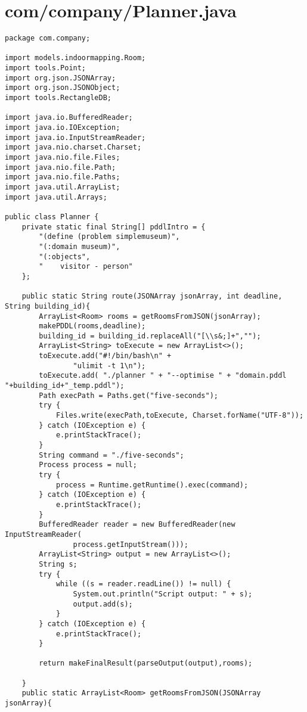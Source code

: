 \documentclass{article}
\begin{document}
\section{com/company/Planner.java}
\begin{lstlisting}package com.company;

import models.indoormapping.Room;
import tools.Point;
import org.json.JSONArray;
import org.json.JSONObject;
import tools.RectangleDB;

import java.io.BufferedReader;
import java.io.IOException;
import java.io.InputStreamReader;
import java.nio.charset.Charset;
import java.nio.file.Files;
import java.nio.file.Path;
import java.nio.file.Paths;
import java.util.ArrayList;
import java.util.Arrays;

public class Planner {
    private static final String[] pddlIntro = {
        "(define (problem simplemuseum)",
        "(:domain museum)",
        "(:objects",
        "    visitor - person"
    };

    public static String route(JSONArray jsonArray, int deadline, String building_id){
        ArrayList<Room> rooms = getRoomsFromJSON(jsonArray);
        makePDDL(rooms,deadline);
        building_id = building_id.replaceAll("[\\s&;]+","");
        ArrayList<String> toExecute = new ArrayList<>();
        toExecute.add("#!/bin/bash\n" +
                "ulimit -t 1\n");
        toExecute.add( "./planner " + "--optimise " + "domain.pddl "+building_id+"_temp.pddl");
        Path execPath = Paths.get("five-seconds");
        try {
            Files.write(execPath,toExecute, Charset.forName("UTF-8"));
        } catch (IOException e) {
            e.printStackTrace();
        }
        String command = "./five-seconds";
        Process process = null;
        try {
            process = Runtime.getRuntime().exec(command);
        } catch (IOException e) {
            e.printStackTrace();
        }
        BufferedReader reader = new BufferedReader(new InputStreamReader(
                process.getInputStream()));
        ArrayList<String> output = new ArrayList<>();
        String s;
        try {
            while ((s = reader.readLine()) != null) {
                System.out.println("Script output: " + s);
                output.add(s);
            }
        } catch (IOException e) {
            e.printStackTrace();
        }

        return makeFinalResult(parseOutput(output),rooms);

    }
    public static ArrayList<Room> getRoomsFromJSON(JSONArray jsonArray){


\end{lstlisting}
\end{document}
